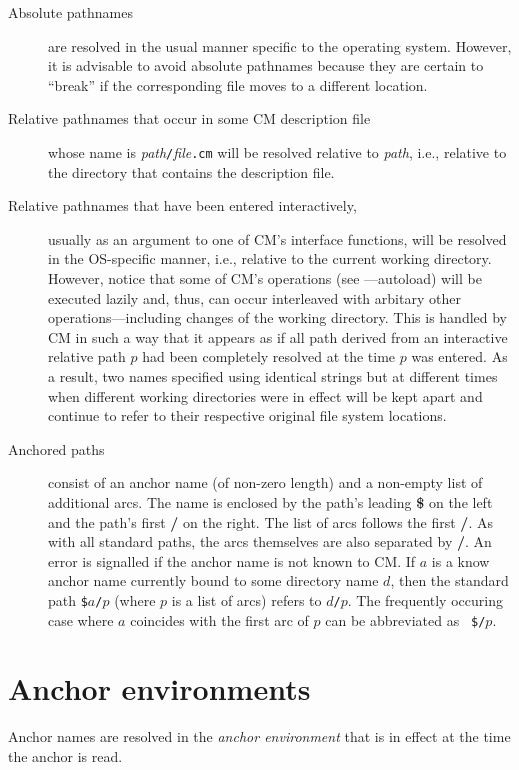 \begin{description}
\item[Absolute pathnames] are resolved in the usual manner
specific to the operating system.  However, it is advisable to avoid
absolute pathnames because they are certain to ``break'' if the
corresponding file moves to a different location.
\item[Relative pathnames that occur in some CM description file] whose
name is {\it path}{\tt /}{\it file}{\tt .cm} will be resolved relative
to {\it path}, i.e., relative to the directory that contains the
description file.
\item[Relative pathnames that have been entered interactively,]
usually as an argument to one of CM's interface functions, will be
resolved in the OS-specific manner, i.e., relative to the current
working directory.  However, notice that some of CM's operations (see
---autoload) will be executed lazily and,
thus, can occur interleaved with arbitary other operations---including
changes of the working directory.  This is handled by CM in such a way
that it appears as if all path derived from an interactive relative
path $p$ had been completely resolved at the time $p$ was entered. As
a result, two names specified using identical strings but at different
times when different working directories were in effect will be kept
apart and continue to refer to their respective original file system
locations.
\item[Anchored paths] consist of an anchor name (of non-zero length)
and a non-empty list of additional arcs.  The name is enclosed by
the path's leading {\bf \$} on the left and the path's first {\bf /}
on the right.  The list of arcs follows the first {\bf /}.  As with
all standard paths, the arcs themselves are also separated by {\bf /}.
An error is signalled if the anchor name is not known to CM.
If $a$ is a know anchor name currently bound to some directory name
$d$, then the standard path {\tt \$}$a${\tt /}$p$ (where $p$ is a list
of arcs) refers to $d${\tt /}$p$.  The frequently occuring case where
$a$ coincides with the first arc of $p$ can be abbreviated as {\tt
\$/}$p$.
\end{description}

\section{Anchor environments}
\label{sec:anchor:env}

Anchor names are resolved in the {\em anchor environment} that is in
effect at the time the anchor is read.

